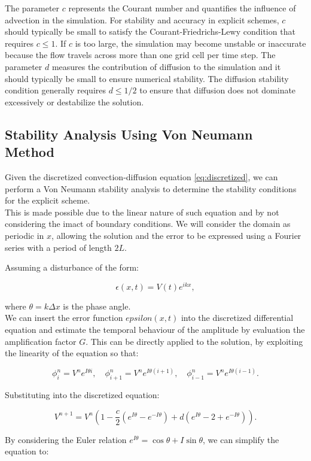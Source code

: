 \documentclass{article}
\begin{document}
The parameter $c$ represents the Courant number and quantifies the influence of advection in the simulation. 
For stability and accuracy in explicit schemes, $c$ should typically be small to satisfy the Courant-Friedrichs-Lewy condition that requires $c \leq 1$. 
If $c$ is too large, the simulation may become unstable or inaccurate because the flow travels across more than one grid cell per time step.
The parameter $d$ measures the contribution of diffusion to the simulation and it should typically be small to ensure numerical stability.
The diffusion stability condition generally requires $d \leq 1/2$ to ensure that diffusion does not dominate excessively or destabilize the solution.


\subsection{Stability Analysis Using Von Neumann Method}
Given the discretized convection-diffusion equation \eqref{eq:discretized}, we can perform a Von Neumann stability analysis to determine the stability conditions for the explicit scheme. 
\\This is made possible due to the linear nature of such equation and by not considering the imact of boundary conditions. 
We will consider the domain as periodic in \(x\), allowing the solution and the error to be expressed using a Fourier series with a period of length \(2L\).

Assuming a disturbance of the form:

\[
\epsilon(x, t) = V(t) e^{ikx},
\]

where $\theta = k \Delta x$ is the phase angle.
\\We can insert the error function \(epsilon(x, t)\) into the discretized differential equation and estimate the temporal behaviour of the amplitude by evaluation the amplification factor \(G\). This can be directly applied to the solution, by exploiting the linearity of the equation so that:

\[
\phi_i^n = V^n e^{I \theta i}, \quad \phi_{i+1}^n = V^n e^{I \theta (i+1)}, \quad \phi_{i-1}^n = V^n e^{I \theta (i-1)}.
\]

Substituting into the discretized equation:

\[
V^{n+1} = V^n \left(1 - \frac{c}{2} (e^{I \theta} - e^{-I \theta}) + d (e^{I \theta} - 2 + e^{-I \theta})\right).
\]

By considering the Euler relation \(e^{I \theta} = \cos \theta + I \sin \theta\), we can simplify the equation to:
\end{document}
